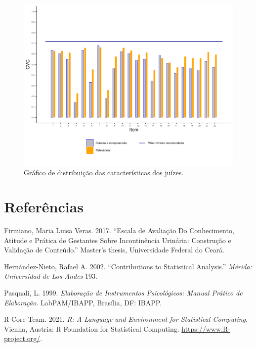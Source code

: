 \documentclass[
]{article}
\newlength{\cslhangindent}
\newlength{\cslentryspacingunit} %
\newenvironment{CSLReferences}[2] %
 {%
  \setlength{\parindent}{0pt}
  \ifodd #1
  \let\oldpar\par
  \def\par{\hangindent=\cslhangindent\oldpar}
  \fi
  \setlength{\parskip}{#2\cslentryspacingunit}
 }%
 {}
\begin{document}
\begin{figure}[htbp]

{\centering \includegraphics[width=0.9\linewidth]{../figures/grafico2_80_perc} 

}

\caption{Gráfico de distribuição das características dos juízes.}\label{fig:grafico2V2}
\end{figure}

\cleardoublepage

\hypertarget{referuxeancias}{%
\section*{Referências}\label{referuxeancias}}

\hypertarget{refs}{}
\begin{CSLReferences}{1}{0}
\leavevmode{}%
Firmiano, Maria Luisa Veras. 2017. {``Escala de Avaliação Do Conhecimento, Atitude e Prática de Gestantes Sobre Incontinência Urinária: Construção e Validação de Conteúdo.''} Master's thesis, Universidade Federal do Ceará.

\leavevmode{}%
Hernández-Nieto, Rafael A. 2002. {``Contributions to Statistical Analysis.''} \emph{M{é}rida: Universidad de Los Andes} 193.

\leavevmode{}%
Pasquali, L. 1999. \emph{Elaboração de Instrumentos Psicológicos: Manual Prático de Elaboração}. LabPAM/IBAPP, Brasília, DF: IBAPP.

\leavevmode{}%
R Core Team. 2021. \emph{R: A Language and Environment for Statistical Computing}. Vienna, Austria: R Foundation for Statistical Computing. \url{https://www.R-project.org/}.

\end{CSLReferences}
\end{document}
